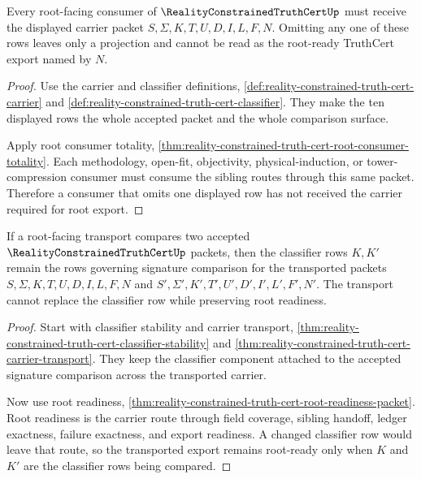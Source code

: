\begin{theorem}
\label{thm:reality-constrained-truth-cert-root-carrier-obligation}
Every root-facing consumer of $\RealityConstrainedTruthCertUp$ must receive the
displayed carrier packet $S,\Sigma,K,T,U,D,I,L,F,N$. Omitting any one of these
rows leaves only a projection and cannot be read as the root-ready TruthCert
export named by $N$.
\end{theorem}
\begin{proof}
Use the carrier and classifier definitions,
\autoref{def:reality-constrained-truth-cert-carrier} and
\autoref{def:reality-constrained-truth-cert-classifier}. They make the ten
displayed rows the whole accepted packet and the whole comparison surface.

Apply root consumer totality,
\autoref{thm:reality-constrained-truth-cert-root-consumer-totality}. Each
methodology, open-fit, objectivity, physical-induction, or tower-compression
consumer must consume the sibling routes through this same packet. Therefore a
consumer that omits one displayed row has not received the carrier required for
root export.
\end{proof}

\begin{theorem}
\label{thm:reality-constrained-truth-cert-root-classifier-stability}
If a root-facing transport compares two accepted
$\RealityConstrainedTruthCertUp$ packets, then the classifier rows $K,K'$ remain
the rows governing signature comparison for the transported packets
$S,\Sigma,K,T,U,D,I,L,F,N$ and
$S',\Sigma',K',T',U',D',I',L',F',N'$. The transport cannot replace the
classifier row while preserving root readiness.
\end{theorem}
\begin{proof}
Start with classifier stability and carrier transport,
\autoref{thm:reality-constrained-truth-cert-classifier-stability} and
\autoref{thm:reality-constrained-truth-cert-carrier-transport}. They keep the
classifier component attached to the accepted signature comparison across the
transported carrier.

Now use root readiness,
\autoref{thm:reality-constrained-truth-cert-root-readiness-packet}. Root
readiness is the carrier route through field coverage, sibling handoff, ledger
exactness, failure exactness, and export readiness. A changed classifier row
would leave that route, so the transported export remains root-ready only when
$K$ and $K'$ are the classifier rows being compared.
\end{proof}

